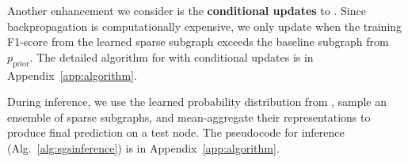 Another enhancement we consider is the \textbf{conditional updates} to \edgemlp. Since backpropagation is computationally expensive, we only update \edgemlp when the training F1-score from the learned sparse subgraph exceeds the baseline subgraph from $p_\mathrm{prior}$. The detailed algorithm for \sgs with conditional updates is in Appendix~\ref{app:algorithm}.

During inference, we use the learned probability distribution from \edgemlp, sample an ensemble of sparse subgraphs, and mean-aggregate their representations to produce final prediction on a test node. The pseudocode for inference (Alg.~\ref{alg:sgsinference}) is in Appendix~\ref{app:algorithm}.

\begin{comment}%
\noindent\textbf{Degree bias augmentation with a prior.} 
The search space for learning algorithms to identify optimal sparse graphs can be extensive in large-scale graphs. To address this, we can use a prior probability distribution $p_\mathrm{prior}$ based on \emph{degree}~\cite{zeng2019graphsaint}. This distribution favors edges connected to vertices with low degrees and assigns lower selection probabilities to edges within denser clusters. Due to computational efficiency, we chose degree-proportionate prior over \emph{effective resistance}. We control the bias between the learned and prior probability distributions using the control parameter $\lambda \in [0,1]$. The probability distribution becomes, $\tilde{p}(u,v) = \lambda \tilde{p}(u,v) + (1-\lambda) p_\mathrm{prior}(u,v)$, where $\tilde{p}$ is the learned probability distribution and degree norm $p_\mathrm{prior}$ for edge ($u,v$) is,
\vspace{-8pt}
 \begin{equation}
\label{eq:prior}
 p_\mathrm{prior}(u,v) = \frac{1/d_u + 1/d_v}{\sum_{i,j\in \gE} (1/d_i + 1/d_j)}.
\end{equation}

\noindent\textbf{METIS graph partitioning.}
We can use \edgemlp from Alg.~\ref{alg:edgmlp} for edge weight computation in large graphs. However, we want efficient batch processing on edges, avoid gradient accumulation, and make the training process stochastic. This helps train GNN models with fewer epochs by reducing the likelihood of getting stuck in local minima.
One crucial step is selecting a batch of edges such that the vertices in a batch of edges have high locality and preferably from within a cluster. To achieve this, we consider very fast graph partitioning methods like METIS~\cite{karypis1997metis}.


\end{comment}
